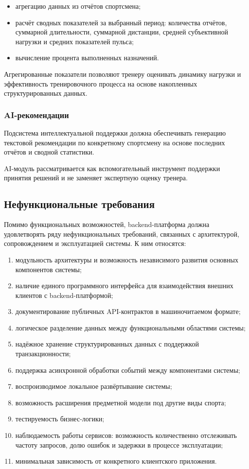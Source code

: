 \begin{itemize}
\tightlist
\item
  агрегацию данных из отчётов спортсмена;
\item
  расчёт сводных показателей за выбранный период: количества отчётов, суммарной длительности, суммарной дистанции, средней субъективной нагрузки и средних показателей пульса;
\item
  вычисление процента выполненных назначений.
\end{itemize}

Агрегированные показатели позволяют тренеру оценивать динамику нагрузки и эффективность тренировочного процесса на основе накопленных структурированных данных.

\subsubsection{AI-рекомендации}

Подсистема интеллектуальной поддержки должна обеспечивать генерацию текстовой рекомендации по конкретному спортсмену на основе последних отчётов и сводной статистики.

AI-модуль рассматривается как вспомогательный инструмент поддержки принятия решений и не заменяет экспертную оценку тренера.

\subsection{Нефункциональные требования}

Помимо функциональных возможностей, backend-платформа должна удовлетворять ряду нефункциональных требований, связанных с архитектурой, сопровождением и эксплуатацией системы. К ним относятся:

\begin{enumerate}
\def\labelenumi{\arabic{enumi}.}
\tightlist
\item
  модульность архитектуры и возможность независимого развития основных компонентов системы;
\item
  наличие единого программного интерфейса для взаимодействия внешних клиентов с backend-платформой;
\item
  документирование публичных API-контрактов в машиночитаемом формате;
\item
  логическое разделение данных между функциональными областями системы;
\item
  надёжное хранение структурированных данных с поддержкой транзакционности;
\item
  поддержка асинхронной обработки событий между компонентами системы;
\item
  воспроизводимое локальное развёртывание системы;
\item
  возможность расширения предметной модели под другие виды спорта;
\item
  тестируемость бизнес-логики;
\item
  наблюдаемость работы сервисов: возможность количественно отслеживать частоту запросов, долю ошибок и задержки в процессе эксплуатации;
\item
  минимальная зависимость от конкретного клиентского приложения.
\end{enumerate}

